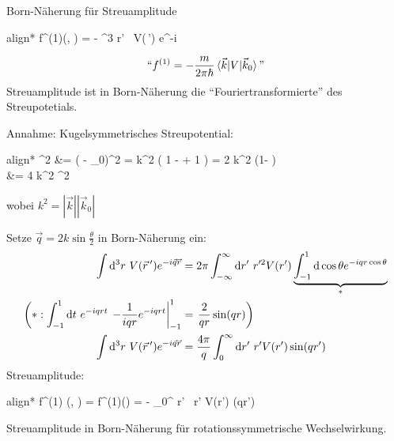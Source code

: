 	
	Born-Näherung für Streuamplitude
		\begin{empheq}[box=\boxed]{align*}
			f^{(1)}(\theta, \phi) =
			- 
			\int \diff^3 r' ~V(\,') e^{-i  \cdot {}}
		\end{empheq} 
		\begin{align*}
			``f^{(1)} = -\frac{m}{2 \pi \hbar} 
			\braket{ \vec{k} | V | \vec{k}_0}\text{''}
		\end{align*}
	Streuamplitude ist in Born-Näherung die ``Fouriertransformierte'' des Streupotetials.
	
	Annahme: Kugelsymmetrisches Streupotential:
		\begin{empheq}[box=\boxed]{align*}
			^2 &= (\vec{k} - _0)^2 
			= k^2 \left( 1 - \frac{2  \vec{k}_0}{k^2}
			+ 1 \right)	
			= 2 k^2 (1- \cos \theta) \\
			&= 4 k^2 \sin^2 
		\end{empheq}
	wobei $k^2 = |\vec{k}| |\vec{k}_0|$
	
	Setze $\vec{q} = 2 k \sin \frac{\theta}{2}$ in Born-Näherung ein:
		\begin{align*}
			\int \mathrm{d}^3 r ~V(\vec{r}\,') e^{-i \vec{q} \vec{r}}
			&= 2 \pi \int_{-\infty}^{\infty} \mathrm{d} r' 
			~r'^2 V(r') 
			\underbrace{\int_{-1}^1 \mathrm{d} \cos \theta 
			e^{-iqr \cos \theta}}_{\substack{*}} \\
			\left(
			*: \int_{-1}^1 \mathrm{d} t ~e^{-iqr t} \right.
			\left. 
				- \frac{1}{iqr} e^{-iqrt}
			\right|_{-1}^1
			&= 
				\left. \frac{2}{qr} \sin (qr)
			\right) \\
			\int \mathrm{d}^3 r ~V(\vec{r}\,') e^{-i \vec{q} \vec{r}}
			&= \frac{4 \pi}{q} \int_{0}^{\infty}
			\mathrm{d} r' ~r' V(r') \sin (qr')
		\end{align*}
	Streuamplitude: 
		\begin{empheq}[box=\boxed]{align*}
			f^{(1)} (\theta, \phi) = f^{(1)}(\theta)
			= -  
			\int_0^{\infty} \diff r' ~r' V(r') \sin (qr')
		\end{empheq}
	Streuamplitude in Born-Näherung für rotationssymmetrische Wechselwirkung.
	
